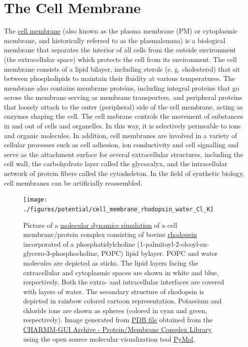 \hypertarget{the-cell-membrane-1}{%
\chapter{The Cell Membrane}\label{the-cell-membrane-1}}

The \href{https://en.wikipedia.org/wiki/Cell_membrane}{cell membrane} (also known as the plasma membrane (PM) or cytoplasmic membrane, and historically referred to as the plasmalemma) is a biological membrane that separates the interior of all cells from the outside environment (the extracellular space) which protects the cell from its environment. The cell membrane consists of a lipid bilayer, including sterols (e. g. cholesterol) that sit between phospholipids to maintain their fluidity at various temperatures. The membrane also contains membrane proteins, including integral proteins that go across the membrane serving as membrane transporters, and peripheral proteins that loosely attach to the outer (peripheral) side of the cell membrane, acting as enzymes shaping the cell. The cell mebrane controls the movement of substances in and out of cells and organelles. In this way, it is selectively permeable to ions and organic molecules. In addition, cell membranes are involved in a variety of cellular processes such as cell adhesion, ion conductivity and cell signalling and serve as the attachment surface for several extracellular structures, including the cell wall, the carbohydrate layer called the glycocalyx, and the intracellular network of protein fibers called the cytoskeleton. In the field of synthetic biology, cell membranes can be artificially reassembled.



\begin{figure}

{\centering \texttt{[image: ./figures/potential/cell\_membrane\_rhodopsin\_water\_Cl\_K]} 

}

\caption{Picture of a \href{https://doi.org/10.1371/journal.pone.0000880}{molecular dynamics simulation} of a cell membrane/protein complex consisting of bovine \href{https://en.wikipedia.org/wiki/Rhodopsin}{rhodopsin} incorporated of a phosphatidylcholine (1-palmitoyl-2-oleoyl-sn-glycero-3-phosphocholine, POPC) lipid bylayer. POPC and water molecules are depicted as sticks. The lipid layers facing the extracellular and cytoplasmic spaces are shown in white and blue, respectively. Both the extra- and intracellular interfaces are covered with layers of water. The secondary structure of rhodopsin is depicted in rainbow colored cartoon representation. Potassium and chloride ions are shown as spheres (colored in cyan and green, respectively). Image generated from \href{http://www.charmm-gui.org/archive/complex/1gzm_rect_popc.pdb}{PDB file} obtained from the \href{http://www.charmm-gui.org/?doc=archive\&lib=complex}{CHARMM-GUI Archive - Protein/Membrane Complex Library} using the open source molecular visualization tool \href{https://pymol.org/2/}{PyMol}.}\label{fig:cellmembrane}
\end{figure}

